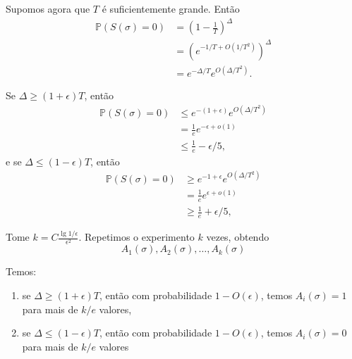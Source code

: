 Supomos agora que $T$ \'e suficientemente grande. Ent\~ao
\begin{align*}
\mathbb{P}(S(\sigma)=0) &= \left(1 - \frac{1}{T} \right) ^\Delta\\
						&= \left(e^{ - 1/T +O(1/T^2)}\right) ^\Delta\\
						&= e^{-\Delta/T} e^{O(\Delta/T^2)}.
\end{align*}

Se $\Delta \ge (1+\epsilon)T$, ent\~ao
\begin{align*}
\mathbb{P}(S(\sigma) = 0) &\le e^{-(1+\epsilon)}e^{O(\Delta/T^2)}\\
						  &=\frac{1}{e} e^{-\epsilon + o(1)}\\
						  &\le \frac{1}{e} -\epsilon/5,
\end{align*}
e se $\Delta \le (1-\epsilon)T$, ent\~ao
\begin{align*}
\mathbb{P}(S(\sigma) = 0) &\ge e^{-1+\epsilon}e^{O(\Delta/T^2)}\\
						  &=\frac{1}{e} e^{\epsilon + o(1)}\\
						  &\ge \frac{1}{e} +\epsilon/5,
\end{align*}

Tome $k=C\frac{\lg 1/\epsilon}{\epsilon^2}$. Repetimos o experimento $k$ vezes, obtendo
\[A_1(\sigma), A_2(\sigma),\dots,A_k(\sigma)\]

Temos:
\begin{enumerate}
\item se $\Delta \ge (1 + \epsilon)T$, ent\~ao com probabilidade $1-O(\epsilon)$, temos $A_i(\sigma) = 1$ para mais de $k/e$ valores,
\item se $\Delta \le (1 - \epsilon)T$, ent\~ao com probabilidade $1-O(\epsilon)$, temos $A_i(\sigma) = 0$ para mais de $k/e$ valores
\end{enumerate}
